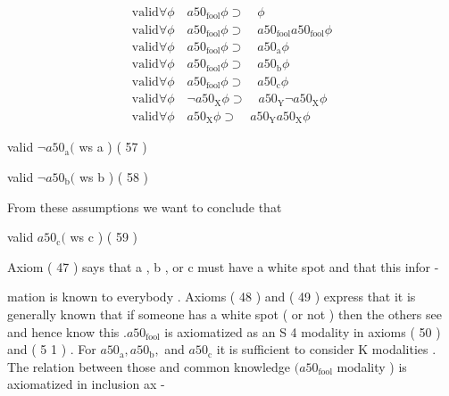 \documentclass[10pt]{article}
\begin{document}
\begin{align*}
 \mathrm{valid}   \forall  \phi  \quad  a50 _{ \mathrm{fool} }  \phi   \supset  \quad  \phi \tag*{$ (  50  ) $}\\ \mathrm{valid}   \forall  \phi  \quad  a50 _{ \mathrm{fool} }  \phi   \supset  \quad  a50 _{ \mathrm{fool} }  a50 _{ \mathrm{fool} }  \phi \tag*{$ (  5  1  ) $}\\ \mathrm{valid}   \forall  \phi  \quad  a50 _{ \mathrm{fool} }  \phi   \supset  \quad  a50 _{ \mathrm{a} }  \phi \tag*{$ (  52  ) $}\\ \mathrm{valid}   \forall  \phi  \quad  a50 _{ \mathrm{fool} }  \phi   \supset  \quad  a50 _{ \mathrm{b} }  \phi \tag*{$ (  53  ) $}\\ \mathrm{valid}   \forall  \phi  \quad  a50 _{ \mathrm{fool} }  \phi   \supset  \quad  a50 _{ \mathrm{c} }  \phi \tag*{$ (  54  ) $}\\ \mathrm{valid}   \forall  \phi  \quad  \neg   a50 _{ \mathrm{X} }  \phi   \supset  \quad  a50 _{ \mathrm{Y} }  \neg   a50 _{ \mathrm{X} }  \phi \tag*{$ (  55  ) $}\\ \mathrm{valid}   \forall  \phi  \quad  a50 _{ \mathrm{X} }  \phi   \supset  \quad  a50 _{ \mathrm{Y} }  a50 _{ \mathrm{X} }  \phi \tag*{$ (  56  ) $}
\end{align*}

\hspace*{\fill}valid  $ \neg   a50 _{ \mathrm{a} }  ( $  ws a ) \quad ( 57 ) 

\hspace*{\fill}valid  $ \neg   a50 _{ \mathrm{b} }  ( $  ws b ) \quad ( 58 ) 

\noindent From these assumptions we want to conclude that 

\hspace*{\fill}valid  $ a50 _{ \mathrm{c} }  ( $  ws c ) \quad ( 59 ) 

\hspace*{\fill}Axiom ( 47 ) says that a , b , or c must have a white spot and that this infor - 

\noindent mation is known to everybody . Axioms ( 48 ) and ( 49 ) express that it is generally 
 known that if someone has a white spot ( or not ) then the others see and hence 
 know this  $ .   a50 _{ \mathrm{fool} }$  is axiomatized as an S 4 modality in axioms ( 50 ) and ( 5 1 ) . For 
  $ a50 _{ \mathrm{a} } ,   a50 _{ \mathrm{b} } , $  and  $ a50 _{ \mathrm{c} }$  it is sufficient to consider K modalities . The relation between 
 those and common knowledge  $ (  a50 _{ \mathrm{fool} }$  modality ) is axiomatized in inclusion ax - 
\end{document}

